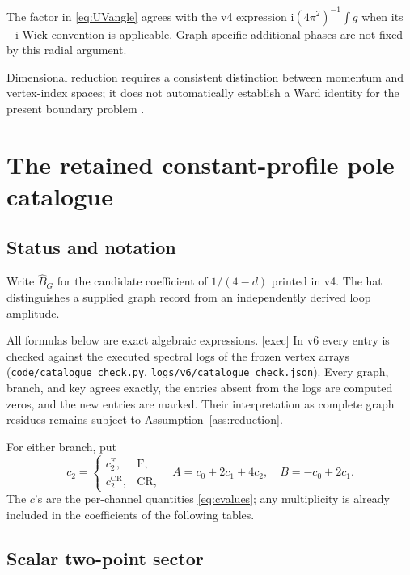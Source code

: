 \documentclass[11pt,a4paper]{article}
\newcommand{\ii}{\mathrm i}
\newcommand{\Fr}{\mathrm F}
\newcommand{\CR}{\mathrm{CR}}
\newcommand{\loc}[1]{\nolinkurl{#1}}
\theoremstyle{plain}
\theoremstyle{definition}
\theoremstyle{remark}
\numberwithin{equation}{section}
\begin{document}
The factor in \eqref{eq:UVangle} agrees with the v4 expression
\(\ii(4\pi^2)^{-1}\int g\) when its \(+\ii\) Wick convention is
applicable. Graph-specific additional phases are not fixed by
this radial argument.

Dimensional reduction requires a consistent distinction between
momentum and vertex-index spaces; it does not automatically establish
a Ward identity for the present boundary problem
\cite{Stockinger}.

\section{The retained constant-profile pole catalogue}
\label{sec:catalogue}

\subsection{Status and notation}

Write \(\widehat B_G\) for the candidate coefficient of
\(1/(4-d)\) printed in v4.
The hat distinguishes a supplied graph record from an independently
derived loop amplitude.

All formulas below are exact algebraic expressions.
\textsf{[exec]} In v6 every entry is checked against the executed
spectral logs of the frozen vertex arrays
(\loc{code/catalogue_check.py}, \loc{logs/v6/catalogue_check.json}).
Every graph, branch, and key agrees exactly, the entries absent from
the logs are computed zeros, and the new entries are marked.
Their interpretation as complete graph residues remains subject to
Assumption~\ref{ass:reduction}.

For either branch, put
\begin{equation}
c_2=
\begin{cases}
c_2^\Fr,&\text{F},\\
c_2^\CR,&\text{CR},
\end{cases}
\quad
A=c_0+2c_1+4c_2,
\quad
B=-c_0+2c_1.
\label{eq:AB}
\end{equation}
The \(c\)'s are the per-channel quantities
\eqref{eq:cvalues}; any multiplicity is already included in the
coefficients of the following tables.

\subsection{Scalar two-point sector}
\end{document}
